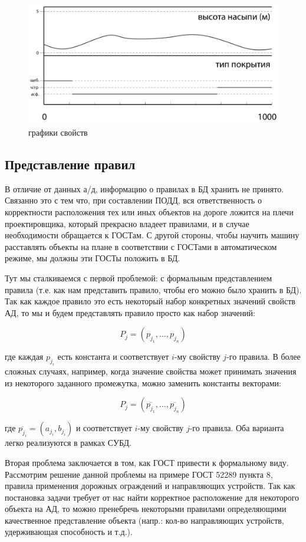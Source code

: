 \begin{figure}[h]
	\centering
	\includegraphics[scale=0.75]{images/auto_prop_graph.jpg}
	\caption{графики свойств}
	\label{auto_prop_graph}
\end{figure}
\subsection{Представление правил}
В отличие от данных а/д, информацию о правилах в БД хранить не принято. Связанно это с тем что, при составлении ПОДД, вся ответственность о корректности расположения тех или иных объектов на дороге ложится на плечи проектировщика, который прекрасно владеет правилами, и в случае необходимости обращается к ГОСТам. С другой стороны, чтобы научить машину расставлять объекты на плане в соответствии с ГОСТами в автоматическом режиме, мы должны эти ГОСТы положить в БД. 

Тут мы сталкиваемся с первой проблемой: с формальным представлением правила (т.е. как нам представить правило, чтобы его можно было хранить в БД). Так как каждое правило это есть некоторый набор конкретных значений свойств АД, то мы и будем представлять правило просто как набор значений:

$$
P_j = (p_{j_1}, \dots, p_{j_n})
$$

где каждая $p_{j_i}$ есть константа и соответствует $i$-му свойству $j$-го правила. В более сложных случаях, например, когда значение свойства может принимать значения из некоторого заданного промежутка, можно заменить константы векторами:

$$
P_j = (\overline{p_{j_1}}, \dots, \overline{p_{j_n}})
$$

где $\overline{p_{j_i}} = (a_{j_i}, b_{j_i})$ и соответствует $i$-му свойству $j$-го правила. Оба варианта легко  реализуются в рамках СУБД. 


Вторая проблема заключается в том, как ГОСТ привести к формальному виду. Рассмотрим решение данной проблемы на примере ГОСТ 52289 пункта 8, правила применения дорожных ограждений и направляющих устройств. Так как постановка задачи требует от нас найти корректное расположение для некоторого объекта на АД, то можно пренебречь некоторыми правилами  определяющими качественное представление объекта (напр.: кол-во направляющих устройств, удерживающая способность и т.д.). 

